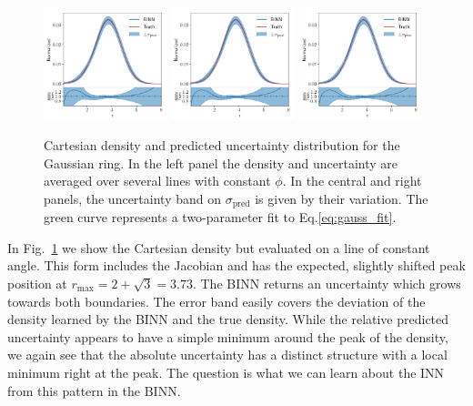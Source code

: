 \begin{figure}[t]
\centering
\includegraphics[width=0.32\textwidth, page=1]{./figures/bINN/gauss_ring_1dplots}
\includegraphics[width=0.32\textwidth, page=2]{./figures/bINN/gauss_ring_1dplots}
\includegraphics[width=0.32\textwidth, page=3]{./figures/bINN/gauss_ring_1dplots}
\caption{Cartesian density and predicted uncertainty distribution for
  the Gaussian ring. In the left panel the density and uncertainty are
  averaged over several lines with constant $\phi$. In the central and
  right panels, the uncertainty band on $\sigma_\text{pred}$ is given
  by their variation.  The green curve represents a two-parameter fit
  to Eq.\eqref{eq:gauss_fit}.}
\label{fig:gauss_unc}
\end{figure}

In Fig.~\ref{fig:gauss_unc} we show the Cartesian density but
evaluated on a line of constant angle. This form includes the Jacobian
and has the expected, slightly shifted peak position at $r_\text{max}
= 2 + \sqrt{3} = 3.73$. The BINN returns an uncertainty
which grows towards both boundaries.  The error band easily covers the
deviation of the density learned by the BINN and the true
density. While the relative predicted uncertainty appears to have a
simple minimum around the peak of the density, we again see that the
absolute uncertainty has a distinct structure with a local minimum
right at the peak. The question is what we can learn about the INN
from this pattern in the BINN.

